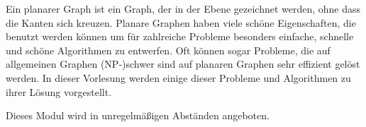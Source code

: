 \begin{module}
\begin{learningoutcomes}
\end{learningoutcomes}

\begin{content}
Ein planarer Graph ist ein Graph, der in der Ebene gezeichnet werden, ohne dass die Kanten sich kreuzen. Planare Graphen haben viele schöne Eigenschaften, die benutzt werden können um für zahlreiche Probleme besonders einfache, schnelle und schöne Algorithmen zu entwerfen. Oft können sogar Probleme, die auf allgemeinen Graphen (NP-)schwer sind auf planaren Graphen sehr effizient gelöst werden. In dieser Vorlesung werden einige dieser Probleme und Algorithmen zu ihrer Lösung vorgestellt.


\end{content}

\begin{remarks}Dieses Modul wird in unregelmäßigen Abständen angeboten.

\end{remarks}

\end{module}

